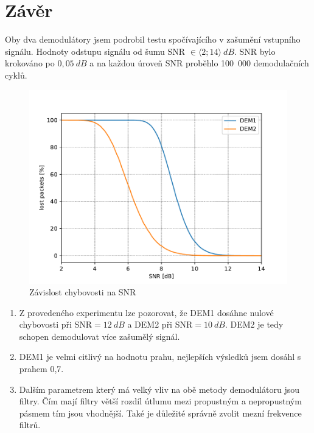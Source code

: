 \section*{Závěr}

Oby dva demodulátory jsem podrobil testu spočívajícího v zašumění vstupního signálu. Hodnoty odstupu signálu od šumu SNR $\in \langle 2; 14 \rangle~dB$. SNR bylo krokováno po $0,05~dB$ a na každou úroveň SNR proběhlo 100~000 demodulačních cyklů.

\begin{figure}[H]
    \centering
    \includegraphics[width=\textwidth]{img/lost_packets.pdf}
    \caption{Závislost chybovosti na SNR}
\end{figure}


\begin{enumerate}
    \item  Z provedeného experimentu lze pozorovat, že DEM1 dosáhne nulové chybovosti při SNR$ = 12~dB$ a DEM2 při SNR$ = 10~dB$. DEM2 je tedy schopen  demodulovat více zašumělý signál.
    \item DEM1 je velmi citlivý na hodnotu prahu, nejlepších výsledků jsem dosáhl s prahem 0,7.
    \item Dalším parametrem který má velký vliv na obě metody demodulátoru jsou filtry. Čím mají filtry větší rozdíl útlumu mezi propustným a nepropustným pásmem tím jsou vhodnější. Také je důležité správně zvolit mezní frekvence filtrů.
\end{enumerate}

